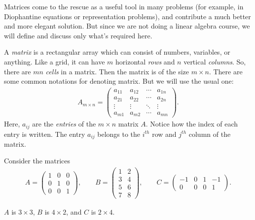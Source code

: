 \documentclass{subfile}
\begin{document}
	Matrices come to the rescue as a useful tool in many problems (for example, in Diophantine equations or representation problems), and contribute a much better and more elegant solution. But since we are not doing a linear algebra course, we will define and discuss only what's required here.
	
	\begin{definition}[Matrix]
		A \textit{matrix} is a rectangular array which can consist of numbers, variables, or anything. Like a grid, it can have $m$ horizontal \textit{rows} and $n$ vertical \textit{columns}. So, there are $mn$ \textit{cells} in a matrix. Then the matrix is of the size $m\times n$. There are some common notations for denoting matrix. But we will use the usual one:
		\begin{align*}
		{A_{m \times n}} = \begin{pmatrix}
			{{a_{11}}}&{{a_{12}}}& \cdots &{{a_{1n}}}\\
			{{a_{21}}}&{{a_{22}}}& \cdots &{{a_{2n}}}\\
			\vdots & \vdots & \ddots & \vdots \\
			{{a_{m1}}}&{{a_{m2}}}& \cdots &{{a_{mn}}}
			\end{pmatrix}.
			\end{align*}
		Here, $a_{ij}$ are the \textit{entries} of the $m\times n$ matrix $A$. Notice how the index of each entry is written. The entry $a_{ij}$ belongs to the $i^{th}$ row and $j^{th}$ column of the matrix.
	\end{definition}
	
	\begin{example}
	Consider the matrices
		\begin{align*}
		A = \begin{pmatrix}
			1&0&0\\
			0&1&0\\
			0&0&1
			\end{pmatrix},\qquad B = \begin{pmatrix}
			1&2\\
			3&4\\
			5&6\\
			7&8
			\end{pmatrix},\qquad C = \begin{pmatrix}
			{ - 1}&0&1&{ - 1}\\
			0&0&0&1
			\end{pmatrix}.
		\end{align*}
		
	$A$ is $3\times 3$, $B$ is $4\times 2$, and $C$ is $2 \times 4$. 
	\end{example}
	
\end{document}
